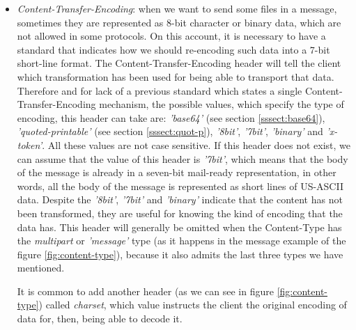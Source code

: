 \begin{itemize}
	\item\textit{Content-Transfer-Encoding}: when we want to send some files in a message, sometimes they are represented as 8-bit character or binary data, which are not allowed in some protocols. On this account, it is necessary to have a standard that indicates how we should re-encoding such data into a 7-bit short-line format. The Content-Transfer-Encoding header \citep{w3cte} will tell the client which transformation has been used for being able to transport that data. Therefore and for lack of a previous standard which states a single Content-Transfer-Encoding mechanism, the possible values, which specify the type of encoding, this header can take are: \textit{'base64'} (see section \ref{sssect:base64}), \textit{'quoted-printable'} (see section \ref{sssect:quot-p}), \textit{'8bit'}, \textit{'7bit'}, \textit{'binary'} and \textit{'x-token'}. All these values are not case sensitive. If this header does not exist, we can assume that the value of this header is \textit{'7bit'}, which means that the body of the message is already in a seven-bit mail-ready representation, in other words, all the body of the message is represented as short lines of US-ASCII data. Despite the \textit{'8bit'}, \textit{'7bit'} and \textit{'binary'} indicate that the content has not been transformed, they are useful for knowing the kind of encoding that the data has. This header will generally be omitted when the Content-Type has the \textit{multipart} or \textit{'message'} type (as it happens in the message example of the figure \ref{fig:content-type}), because it also admits the last three types we have mentioned.
	
	It is common to add another header (as we can see in figure \ref{fig:content-type}) called \textit{charset}, which value instructs the client the original encoding of data for, then, being able to decode it.
\end{itemize}

